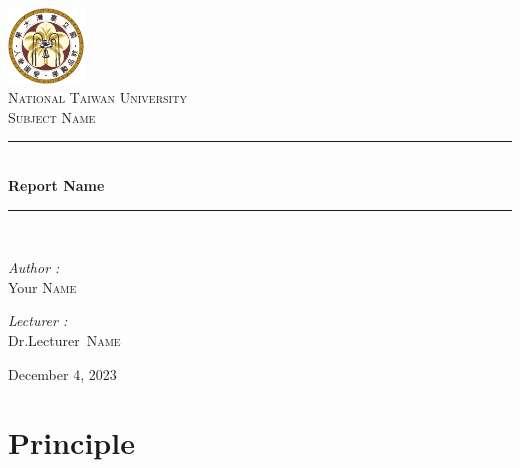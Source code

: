 \documentclass[a4paper,12pt, oneside]{article}
\newcommand{\HRule}{\rule{\linewidth}{2pt}}
\begin{document}
\begin{CJK}{UTF8}{bkai}

\begin{titlepage}

\begin{center}

\includegraphics[width = 0.15\textwidth]{logo.pdf} \\ [1cm]
\textsc{\LARGE National Taiwan University} \\ [1.5cm]
\textsc{\Large Subject Name } \\ [0.5cm]


\HRule \\ [0.5cm]
{ \huge \bfseries Report Name} \\ [0.5cm]
\HRule \\ [2.5cm]

\begin{minipage}{0.4\textwidth}
\begin{flushleft} \large
\emph{Author :}\\
Your \textsc{Name}
\end{flushleft}
\end{minipage}
%
\begin{minipage}{0.4\textwidth}
\begin{flushright} \large
\emph{Lecturer :} \\
Dr.Lecturer~\textsc{Name}\\
\end{flushright}
\end{minipage}


\vfill
{\large December 4, 2023}

\end{center}

\end{titlepage}
\setcounter{page}{1}

\section{Principle}

\end{CJK}
\end{document}

